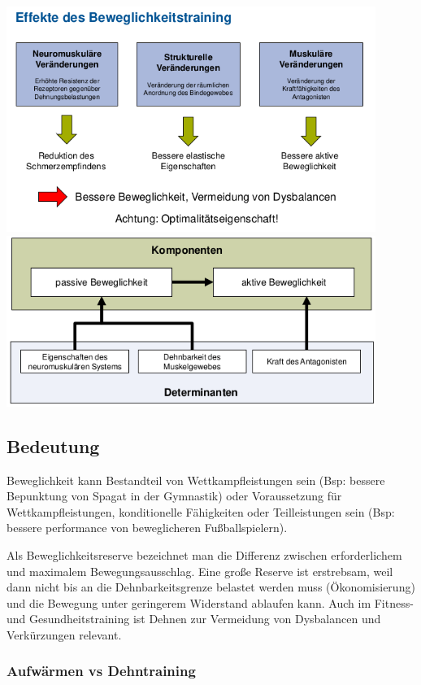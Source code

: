 \includegraphics[width=0.9\textwidth]{pictures/beweg_effekte}
\includegraphics[width=0.9\textwidth]{pictures/beweg_determinanten2}

\subsection{Bedeutung}

Beweglichkeit kann Bestandteil von Wettkampfleistungen sein (Bsp: bessere Bepunktung von Spagat in der Gymnastik) oder Voraussetzung für Wettkampfleistungen, konditionelle Fähigkeiten oder Teilleistungen sein (Bsp: bessere performance von beweglicheren Fußballspielern).

Als Beweglichkeitsreserve bezeichnet man die Differenz zwischen erforderlichem und maximalem Bewegungsausschlag. Eine große Reserve ist erstrebsam, weil dann nicht bis an die Dehnbarkeitsgrenze belastet werden muss (Ökonomisierung) und die Bewegung unter geringerem Widerstand ablaufen kann. Auch im Fitness- und Gesundheitstraining ist Dehnen zur Vermeidung von Dysbalancen und Verkürzungen relevant.

\subsubsection*{Aufwärmen vs Dehntraining}

